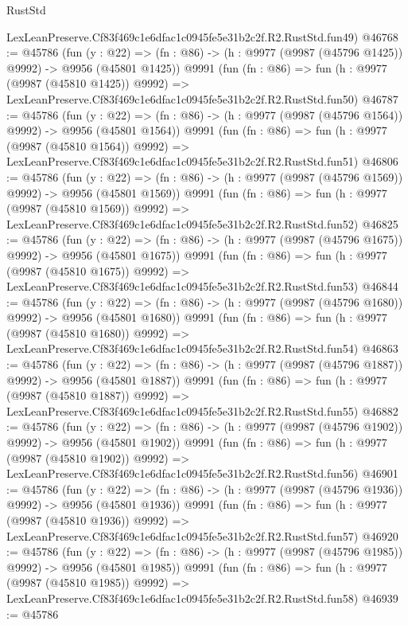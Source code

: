 \begin{lexlean}{RustStd}
\begin{coremodule}
    LexLeanPreserve.Cf83f469c1e6dfac1c0945fe5e31b2c2f.R2.RustStd.fun49)
@46768 := @45786
    (fun (y : @22) =>
    (fn : @86) -> (h : @9977 (@9987 (@45796 @1425)) @9992) -> @9956 (@45801 @1425))
    @9991
    (fun (fn : @86) =>
    fun (h : @9977 (@9987 (@45810 @1425)) @9992) =>
    LexLeanPreserve.Cf83f469c1e6dfac1c0945fe5e31b2c2f.R2.RustStd.fun50)
@46787 := @45786
    (fun (y : @22) =>
    (fn : @86) -> (h : @9977 (@9987 (@45796 @1564)) @9992) -> @9956 (@45801 @1564))
    @9991
    (fun (fn : @86) =>
    fun (h : @9977 (@9987 (@45810 @1564)) @9992) =>
    LexLeanPreserve.Cf83f469c1e6dfac1c0945fe5e31b2c2f.R2.RustStd.fun51)
@46806 := @45786
    (fun (y : @22) =>
    (fn : @86) -> (h : @9977 (@9987 (@45796 @1569)) @9992) -> @9956 (@45801 @1569))
    @9991
    (fun (fn : @86) =>
    fun (h : @9977 (@9987 (@45810 @1569)) @9992) =>
    LexLeanPreserve.Cf83f469c1e6dfac1c0945fe5e31b2c2f.R2.RustStd.fun52)
@46825 := @45786
    (fun (y : @22) =>
    (fn : @86) -> (h : @9977 (@9987 (@45796 @1675)) @9992) -> @9956 (@45801 @1675))
    @9991
    (fun (fn : @86) =>
    fun (h : @9977 (@9987 (@45810 @1675)) @9992) =>
    LexLeanPreserve.Cf83f469c1e6dfac1c0945fe5e31b2c2f.R2.RustStd.fun53)
@46844 := @45786
    (fun (y : @22) =>
    (fn : @86) -> (h : @9977 (@9987 (@45796 @1680)) @9992) -> @9956 (@45801 @1680))
    @9991
    (fun (fn : @86) =>
    fun (h : @9977 (@9987 (@45810 @1680)) @9992) =>
    LexLeanPreserve.Cf83f469c1e6dfac1c0945fe5e31b2c2f.R2.RustStd.fun54)
@46863 := @45786
    (fun (y : @22) =>
    (fn : @86) -> (h : @9977 (@9987 (@45796 @1887)) @9992) -> @9956 (@45801 @1887))
    @9991
    (fun (fn : @86) =>
    fun (h : @9977 (@9987 (@45810 @1887)) @9992) =>
    LexLeanPreserve.Cf83f469c1e6dfac1c0945fe5e31b2c2f.R2.RustStd.fun55)
@46882 := @45786
    (fun (y : @22) =>
    (fn : @86) -> (h : @9977 (@9987 (@45796 @1902)) @9992) -> @9956 (@45801 @1902))
    @9991
    (fun (fn : @86) =>
    fun (h : @9977 (@9987 (@45810 @1902)) @9992) =>
    LexLeanPreserve.Cf83f469c1e6dfac1c0945fe5e31b2c2f.R2.RustStd.fun56)
@46901 := @45786
    (fun (y : @22) =>
    (fn : @86) -> (h : @9977 (@9987 (@45796 @1936)) @9992) -> @9956 (@45801 @1936))
    @9991
    (fun (fn : @86) =>
    fun (h : @9977 (@9987 (@45810 @1936)) @9992) =>
    LexLeanPreserve.Cf83f469c1e6dfac1c0945fe5e31b2c2f.R2.RustStd.fun57)
@46920 := @45786
    (fun (y : @22) =>
    (fn : @86) -> (h : @9977 (@9987 (@45796 @1985)) @9992) -> @9956 (@45801 @1985))
    @9991
    (fun (fn : @86) =>
    fun (h : @9977 (@9987 (@45810 @1985)) @9992) =>
    LexLeanPreserve.Cf83f469c1e6dfac1c0945fe5e31b2c2f.R2.RustStd.fun58)
@46939 := @45786

\end{coremodule}
\end{lexlean}
